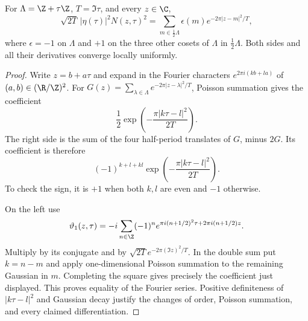 \begin{proposition}\label{ari:C.8.8}
For $\Lambda=\Z+\tau\Z$, $T=\Im\tau$, and every $z\in\C$,
\[
 \sqrt{2T}\,|\eta(\tau)|^2N(z,\tau)^2
 =\sum_{m\in\frac12\Lambda}\epsilon(m)
                         e^{-2\pi|z-m|^2/T},
\]
where $\epsilon=-1$ on $\Lambda$ and $+1$ on the three other
cosets of $\Lambda$ in $\frac12\Lambda$.
Both sides and all their derivatives converge locally uniformly.
\end{proposition}
\begin{proof}
Write $z=b+a\tau$ and expand in the Fourier characters
$e^{2\pi i(kb+la)}$ of $(a,b)\in(\R/\Z)^2$.
For $G(z)=\sum_{\lambda\in\Lambda}e^{-2\pi|z-\lambda|^2/T}$,
Poisson summation gives the coefficient
\[
 \frac12\exp\left(-\frac{\pi|k\tau-l|^2}{2T}\right).
\]
The right side is the sum of the four half-period translates
of $G$, minus $2G$. Its coefficient is therefore
\[
 (-1)^{k+l+kl}
       \exp\left(-\frac{\pi|k\tau-l|^2}{2T}\right).
\]
To check the sign, it is $+1$ when both $k,l$ are even and
$-1$ otherwise.

On the left use
\[
 \vartheta_1(z,\tau)
 =-i\sum_{n\in\Z}(-1)^n
        e^{\pi i(n+1/2)^2\tau+2\pi i(n+1/2)z}.
\]
Multiply by its conjugate and by
$\sqrt{2T}e^{-2\pi(\Im z)^2/T}$.
In the double sum put $k=n-m$ and apply one-dimensional
Poisson summation to the remaining Gaussian in $m$.
Completing the square gives precisely the coefficient just
displayed. This proves equality of the Fourier series.
Positive definiteness of $|k\tau-l|^2$ and Gaussian decay
justify the changes of order, Poisson summation, and every
claimed differentiation.
\end{proof}

